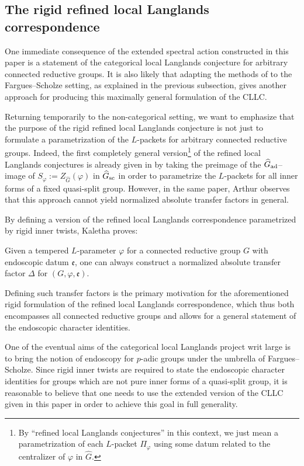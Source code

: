 \subsection{The rigid refined local Langlands correspondence}

One immediate consequence of the extended spectral action constructed in this paper is a statement of the categorical local Langlands conjecture for arbitrary connected reductive groups. It is also likely that adapting the methods of \cite{GLCV} to the Fargues--Scholze setting, as explained in the previous subsection, gives another approach for producing this maximally general formulation of the CLLC. 

Returning temporarily to the non-categorical setting, we want to emphasize that the purpose of the rigid refined local Langlands conjecture is not just to formulate a parametrization of the $L$-packets for arbitrary connected reductive groups. Indeed, the first completely general version\footnote{By ``refined local Langlands conjectures'' in this context, we just mean a parametrization of each $L$-packet $\Pi_{\varphi}$ using some datum related to the centralizer of $\varphi$ in $\widehat{G}$.} of the refined local Langlands conjectures is already given in \cite{Arthur06} by taking the preimage of the $\widehat{G}_{\textnormal{ad}}$--image of $S_{\varphi} := Z_{\widehat{G}}(\varphi)$ in $\widehat{G}_{\textnormal{sc}}$ in order to parametrize the $L$-packets for all inner forms of a fixed quasi-split group. However, in the same paper, Arthur observes that this approach cannot yield normalized absolute transfer factors in general. 

By defining a version of the refined local Langlands correspondence parametrized by rigid inner twists, Kaletha proves:
\begin{thm}
    Given a tempered $L$-parameter $\varphi$ for a connected reductive group $G$ with endoscopic datum $\mathfrak{e}$, one can always construct a normalized absolute transfer factor $\Delta$ for $(G,\varphi,\mathfrak{e})$.
\end{thm}

Defining such transfer factors is the primary motivation for the aforementioned rigid formulation \cite{Kal16} of the refined local Langlands correspondence, which thus both encompasses all connected reductive groups and allows for a general statement of the endoscopic character identities.

One of the eventual aims of the categorical local Langlands project writ large is to bring the notion of endoscopy for $p$-adic groups under the umbrella of Fargues--Scholze. Since rigid inner twists are required to state the endoscopic character identities for groups which are not pure inner forms of a quasi-split group, it is reasonable to believe that one needs to use the extended version of the CLLC given in this paper in order to achieve this goal in full generality.

